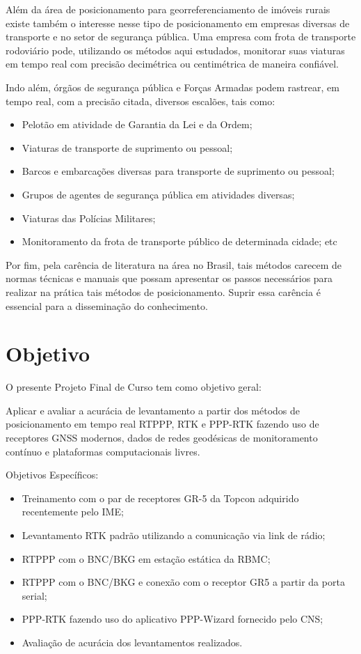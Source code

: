 Além da área de posicionamento para georreferenciamento de imóveis rurais existe também o interesse nesse tipo de posicionamento em empresas diversas de transporte e no setor de segurança pública. Uma empresa com frota de transporte rodoviário pode, utilizando os métodos aqui estudados, monitorar suas viaturas em tempo real com precisão decimétrica ou centimétrica de maneira confiável.

Indo além, órgãos de segurança pública e Forças Armadas podem rastrear, em tempo real, com a precisão citada, diversos escalões, tais como:
\begin{itemize}
    \item Pelotão em atividade de Garantia da Lei e da Ordem;
    \item Viaturas de transporte de suprimento ou pessoal;
    \item Barcos e embarcações diversas para transporte de suprimento ou pessoal;
    \item Grupos de agentes de segurança pública em atividades diversas;
    \item Viaturas das Polícias Militares;
    \item Monitoramento da frota de transporte público de determinada cidade; etc
\end{itemize}

Por fim, pela carência de literatura na área no Brasil, tais métodos carecem de normas técnicas e manuais que possam apresentar os passos necessários para realizar na prática tais métodos de posicionamento. Suprir essa carência é essencial para a disseminação do conhecimento. 


\section{Objetivo}
\noindent
O presente Projeto Final de Curso tem como objetivo geral:

Aplicar e avaliar a acurácia de levantamento a partir dos métodos de posicionamento em tempo real RTPPP, RTK e PPP-RTK fazendo uso de receptores GNSS modernos, dados de redes geodésicas de monitoramento contínuo e plataformas computacionais livres.


Objetivos Específicos:
\begin{itemize}
    \item Treinamento com o par de receptores GR-5 da Topcon adquirido recentemente pelo IME;
    \item Levantamento RTK padrão utilizando a comunicação via link de rádio;
    \item RTPPP com o BNC/BKG em estação estática da RBMC;
    \item RTPPP com o BNC/BKG e conexão com o receptor GR5 a partir da porta serial;
    \item PPP-RTK fazendo uso do aplicativo PPP-Wizard fornecido pelo CNS;
    \item Avaliação de acurácia dos levantamentos realizados.
\end{itemize}


